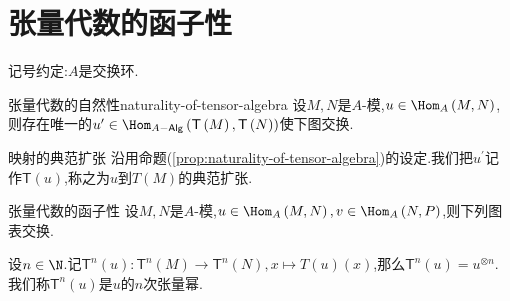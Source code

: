 \section{张量代数的函子性}

记号约定:$A$是交换环.

\begin{proposition}{张量代数的自然性}{naturality-of-tensor-algebra}
	设$M,N$是$A$-模,$u\in\Hom_{A}\left(M,N\right)$,则存在唯一的$u^{\prime}\in\Hom_{A-\mathsf{Alg}}\left(\mathsf{T}\left(M\right),\mathsf{T}\left(N\right)\right)$使下图交换.
	\begin{center}
	\end{center}
\end{proposition}

\begin{definition}{映射的典范扩张}{}
	沿用命题(\cref{prop:naturality-of-tensor-algebra})的设定.我们把$u^{\prime}$记作$\mathsf{T}\left(u\right)$,称之为$u$到$T\left(M\right)$的典范扩张.
\end{definition}

\begin{proposition}{张量代数的函子性}{}
	设$M,N$是$A$-模,$u\in\Hom_{A}\left(M,N\right),v\in\Hom_{A}\left(N,P\right)$,则下列图表交换.
	\begin{center}
	\end{center}
\end{proposition}

\begin{remark}{}{}
	设$n\in\N$.记$\mathsf{T}^{n}\left(u\right):\mathsf{T}^{n}\left(M\right)\to\mathsf{T}^{n}\left(N\right),x\mapsto T\left(u\right)\left(x\right)$,那么$\mathsf{T}^{n}\left(u\right)=u^{\otimes n}$.我们称$\mathsf{T}^{n}\left(u\right)$是$u$的$n$次张量幂.
\end{remark}


